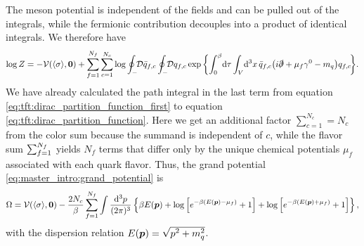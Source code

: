 The meson potential is independent of the fields and can be pulled out of the integrals,
while the fermionic contribution decouples into a product of identical integrals.
We therefore have
\begin{equation}
\begin{split}
	\log Z = -\pot(\avg{\sigma},\vec{0}) + \sum_{f=1}^{N_f} \sum_{c=1}^{N_c} \log \oint_- \!\! \pathintdif \bar{q}_{f,c} \oint_- \!\! \pathintdif q_{f,c} \exp \bigg\{ \! \int_0^\beta \! \dif \tau \int_V \! \dif^3 x \, \bar{q}_{f,c} \big(i \slashed\partial + \mu_f \gamma^0 - m_q\big) q_{f,c} \! \bigg\} .
\end{split}
\end{equation}
We have already calculated the path integral in the last term
from equation \eqref{eq:tft:dirac_partition_function_first} to equation \eqref{eq:tft:dirac_partition_function}.
Here we get an additional factor $\sum_{c=1}^{N_c} = N_c$ from the color sum because the summand is independent of $c$,
while the flavor sum $\sum_{f=1}^{\smash{N_f}}$ yields $N_f$ terms that differ only by the unique chemical potentials $\mu_f$ associated with each quark flavor. 
Thus, the grand potential \eqref{eq:master_intro:grand_potential} is
\begin{equation}
\begin{split}
	\Omega = \pot(\avg{\sigma},\vec{0}) - \frac{2 N_c}{\beta} \sum_{f=1}^{N_f} \int \frac{\dif^3 p}{(2 \pi)^3} \left\{ \beta E(\vec{p}) + \log \left[ e^{-\beta (E(\vec{p}) - \mu_f)}+1 \right] + \log \left[ e^{-\beta (E(\vec{p}) + \mu_f)} + 1\right] \right\} ,
\end{split}
\label{eq:lsm:potential_divergent_logz0}
\end{equation}
with the dispersion relation $E(\vec{p}) = \sqrt{\smash[b]{p^2 + m_q^2}}$.

